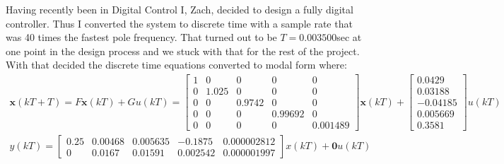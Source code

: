 \documentclass[12pt]{extarticle}
\newenvironment{sect}
  {\adjustwidth{-2.25em}{0pt}}
  {\endadjustwidth}
\begin{document}
\begin{sect}
Having recently been in Digital Control I, Zach, decided to design a fully digital controller. Thus I converted the system to discrete time with a sample rate that was 40 times the fastest pole frequency. That turned out to be $T=0.003500$sec at one point in the design process and we stuck with that for the rest of the project. With that decided the discrete time equations converted to modal form where:
\[\begin{split}\pmb{x}(kT+T)=F\pmb{x}(kT)+Gu(kT)=\begin{bmatrix}1&0&0&0&0\\0&1.025&0&0&0\\0&0&0.9742&0&0\\0&0&0&0.99692&0\\0&0&0&0&0.001489\end{bmatrix}\pmb{x}(kT)+\begin{bmatrix}0.0429\\0.03188\\-0.04185\\0.005669\\0.3581\end{bmatrix}u(kT)\\y(kT)=\begin{bmatrix}0.25&0.00468&0.005635&-0.1875&0.000002812\\0&0.0167&0.01591&0.002542&0.000001997\end{bmatrix}x(kT)+\pmb{0}u(kT)\end{split}\]


\end{sect}
\end{document}
